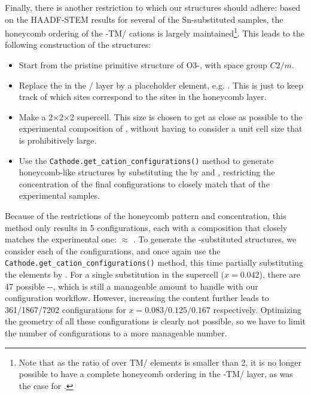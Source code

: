 \begin{refsection}
Finally, there is another restriction to which our structures should adhere: 
based on the HAADF-STEM results for several of the Sn-substituted samples, the 
honeycomb ordering of the -TM/ cations is largely 
maintained\footnote{Note that as the ratio of  over TM/ elements 
is smaller than 2, it is no longer possible to have a complete honeycomb 
ordering in the  -TM/ layer, as was the case for .}. 
This leads to the following construction of the  
structures:  
\begin{itemize} 
\item Start from the pristine primitive structure of O3-, with 
space group $C2/m$. 
\item Replace the  in the / layer by a placeholder 
element, e.g. . This is just to keep track of which sites correspond to 
the  sites in the honeycomb layer. 
\item Make a 2$\times$2$\times$2 supercell. This size is chosen to get as close as possible 
to the experimental composition of , without having to consider a unit 
cell size that is prohibitively large. 
\item Use the \texttt{Cathode.get\_cation\_configurations()} method to 
generate honeycomb-like structures by substituting the  by  and 
, restricting the  concentration of the final configurations to 
closely match that of the experimental samples. 
\end{itemize} 
Because of the restrictions of the honeycomb pattern and  
concentration, this method only results in 5 configurations, each with a 
composition that closely matches the experimental one: 
 $\approx$ . To generate 
the -substituted structures, we consider each of the  
configurations, and once again use the 
\texttt{Cathode.get\_cation\_configurations()} method, this time partially 
substituting the  elements by . For a single  
substitution in the supercell ($x = 0.042$), there are 47 possible 
--, which is still a manageable amount to handle with our 
configuration workflow. However, increasing the  content further leads 
to 361/1867/7202 configurations for $x = 0.083/0.125/0.167$ respectively. 
Optimizing the geometry of all these configurations is clearly not possible, 
so we have to limit the number of configurations to a more manageable number.  
 

\end{refsection}
